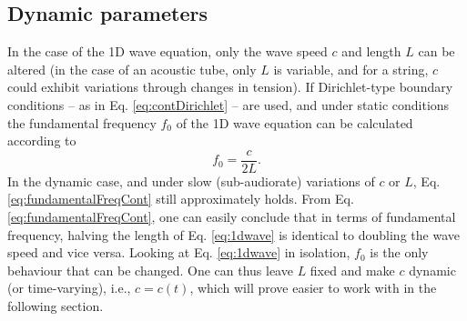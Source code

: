 \subsection{Dynamic parameters}\label{sec:dynamicParamsCont}
In the case of the 1D wave equation, only the wave speed $c$ and length $L$ can be altered (in the case of an acoustic tube, only $L$ is variable, and for a string, $c$ could exhibit variations through changes in tension). If Dirichlet-type boundary conditions -- as in Eq. \eqref{eq:contDirichlet} -- are used, and under static conditions the fundamental frequency $f_0$ of the 1D wave equation can be calculated according to
\begin{equation}\label{eq:fundamentalFreqCont}
    f_0 = \frac{c}{2L}.
\end{equation}
In the dynamic case, and under slow (sub-audiorate) variations of $c$ or $L$, Eq. \eqref{eq:fundamentalFreqCont} still approximately holds.
%
From Eq. \eqref{eq:fundamentalFreqCont}, one can easily conclude that in terms of fundamental frequency, halving the length of Eq. \eqref{eq:1dwave} is identical to doubling the wave speed and vice versa. Looking at Eq. \eqref{eq:1dwave} in isolation, $f_0$ is the only behaviour that can be changed. One can thus leave $L$ fixed %
and make $c$ dynamic (or time-varying), i.e., $c = c(t)$, which will prove easier to work with in the following section.
